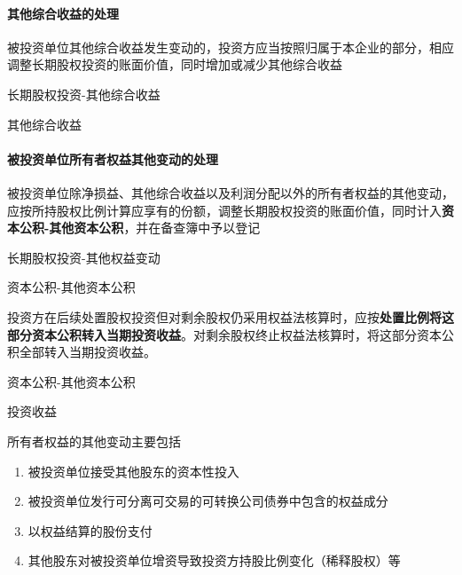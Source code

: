 \documentclass[UTF8,12pt]{ctexart}
\newenvironment{Dr}{%
	\begin{list}{}%
		{
			\setlength{\leftmargin}{2em}
			\setlength{\labelwidth}{2em}
			\setlength{\labelsep}{0pt}
			\setlength{\itemindent}{0pt}
			\setlength{\listparindent}{0pt}
			\setlength{\parsep}{0pt}
			\setlength{\topsep}{0pt}
		}
		\item[\textbf{借：}]
	}{%
	\end{list}
}
\newenvironment{Cr}{%
	\begin{list}{}%
		{
			\setlength{\leftmargin}{2em}
			\setlength{\labelwidth}{2em}
			\setlength{\labelsep}{0pt}
			\setlength{\itemindent}{0pt}
			\setlength{\listparindent}{0pt}
			\setlength{\parsep}{0pt}
			\setlength{\topsep}{0pt}
		}
		\item[\textbf{贷：}]
	}{%
	\end{list}
}
\numberwithin{equation}{section} %
\numberwithin{figure}{section}
\numberwithin{table}{section}
\begin{document}
	
	
	\paragraph{其他综合收益的处理}
	被投资单位其他综合收益发生变动的，投资方应当按照归属于本企业的部分，相应调整长期股权投资的账面价值，同时增加或减少其他综合收益
	
	\begin{Dr}
		长期股权投资-其他综合收益
	\end{Dr}
	\begin{Cr}
		其他综合收益
	\end{Cr}
	
	\paragraph{被投资单位所有者权益其他变动的处理}
	被投资单位除净损益、其他综合收益以及利润分配以外的所有者权益的其他变动，应按所持股权比例计算应享有的份额，调整长期股权投资的账面价值，同时计入\textbf{资本公积-其他资本公积}，并在备查簿中予以登记
	
	\begin{Dr}
		长期股权投资-其他权益变动
	\end{Dr}
	\begin{Cr}
		资本公积-其他资本公积
	\end{Cr}
	
	投资方在后续处置股权投资但对剩余股权仍采用权益法核算时，应按\textbf{处置比例将这部分资本公积转入当期投资收益}。对剩余股权终止权益法核算时，将这部分资本公积全部转入当期投资收益。
	
	\begin{Dr}
		资本公积-其他资本公积
	\end{Dr}
	\begin{Cr}
		投资收益
	\end{Cr}
	
	所有者权益的其他变动主要包括
	\begin{enumerate}
		\item 被投资单位接受其他股东的资本性投入
		
		\item 被投资单位发行可分离可交易的可转换公司债券中包含的权益成分
		
		\item 以权益结算的股份支付
		
		\item 其他股东对被投资单位增资导致投资方持股比例变化（稀释股权）等
	\end{enumerate}
	
\end{document}
